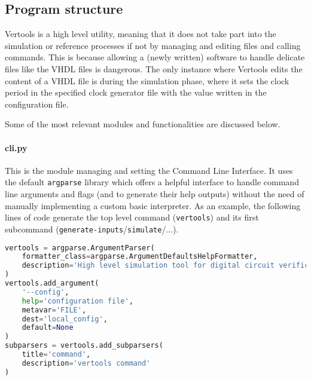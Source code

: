 \subsection{Program structure}
Vertools is a high level utility, meaning that it does not take part into the simulation or reference processes if not by managing and editing files and calling commands. This is because allowing a (newly written) software to handle delicate files like the VHDL files is dangerous.
The only instance where Vertools edits the content of a VHDL file is during the simulation phase, where it sets the clock period in the specified clock generator file with the value written in the configuration file.

Some of the most relevant modules and functionalities are discussed below.

\paragraph{cli.py} This is the module managing and setting the Command Line Interface. It uses the default \texttt{argparse} library which offers a helpful interface to handle command line arguments and flags (and to generate their help outputs) without the need of manually implementing a custom basic interpreter. As an example, the following lines of code generate the top level command (\texttt{vertools}) and its first subcommand (\texttt{generate-inputs}/\texttt{simulate}/...).
\begin{lstlisting}[language=Python, keywords={None}]
vertools = argparse.ArgumentParser(
    formatter_class=argparse.ArgumentDefaultsHelpFormatter,
    description='High level simulation tool for digital circuit verification'
)
vertools.add_argument(
    '--config',
    help='configuration file',
    metavar='FILE',
    dest='local_config',
    default=None
)
subparsers = vertools.add_subparsers(
    title='command',
    description='vertools command'
)
\end{lstlisting}

